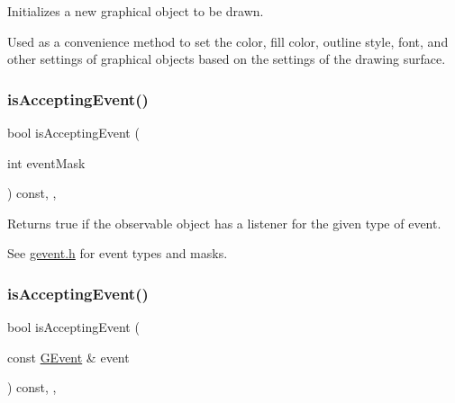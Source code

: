 Initializes a new graphical object to be drawn. 

Used as a convenience method to set the color, fill color, outline style, font, and other settings of graphical objects based on the settings of the drawing surface. \mbox{\label{classGObservable_aeec1adc19aa0f33de62390686ee1382c}} 
\subsubsection{\texorpdfstring{is\+Accepting\+Event()}{isAcceptingEvent()}\hspace{0.1cm}{\footnotesize\ttfamily [1/3]}}
{\footnotesize\ttfamily bool is\+Accepting\+Event (\begin{DoxyParamCaption}\item[{int}]{event\+Mask }\end{DoxyParamCaption}) const\hspace{0.3cm}{\ttfamily [protected]}, {\ttfamily [virtual]}, {\ttfamily [inherited]}}



Returns true if the observable object has a listener for the given type of event. 

See \mbox{\hyperlink{gevent_8h_source}{gevent.\+h}} for event types and masks. \mbox{\label{classGObservable_aa31c73145a29dcb92848a92e0cfaea41}} 
\subsubsection{\texorpdfstring{is\+Accepting\+Event()}{isAcceptingEvent()}\hspace{0.1cm}{\footnotesize\ttfamily [2/3]}}
{\footnotesize\ttfamily bool is\+Accepting\+Event (\begin{DoxyParamCaption}\item[{const \mbox{\hyperlink{classGEvent}{G\+Event}} \&}]{event }\end{DoxyParamCaption}) const\hspace{0.3cm}{\ttfamily [protected]}, {\ttfamily [virtual]}, {\ttfamily [inherited]}}




